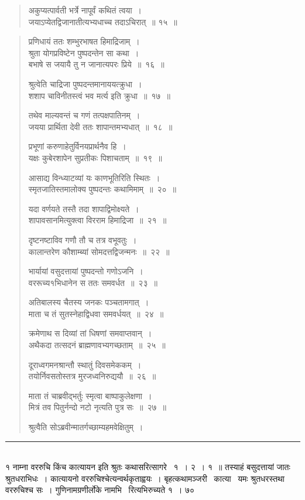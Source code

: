 \documentclass[11pt, openany]{book}
\begin{document}
\begin{multicols}{2}
\begin{quote}
{अकुप्यत्पार्वती भर्त्रे नापूर्वं कथितं त्वया~।\\
जयाऽप्येतद्विजानातीत्यभ्यधाच्च तदाऽचिरात्~॥ १५~॥}
\end{quote}

\columnbreak

\noindent
\begin{quote}
{\mbh प्रणिधायं ततः शम्भुरभाषत हिमाद्रिजाम्~।\\
श्रुता योगप्रविष्टेन पुष्पदन्तेन सा कथा~।\\
बभाषे स जयायै तु न जानात्यपरः प्रिये~॥~१६~॥

श्रुत्वेति चाद्रिजा पुष्पदन्तमानाययत्क्रुधा~।\\
शशाप चाविनीतस्त्वं भव मर्त्य इति क्रुधा~॥~१७~॥

तथेव माल्यवन्तं च गणं तत्पक्षपातिनम्~।\\
जयया प्रार्थिता देवी ततः शापान्तमभ्यधात्~॥~१८~॥

प्रभूणां करुणाहेतुर्विनयप्रार्थनैव हि~।\\ 
यक्षः कुबेरशापेन सुप्रतीकः पिशाचताम्~॥~१९~॥

आसाद्य विन्ध्याटव्यां यः काणभूतिरिति स्थितः~।\\ स्मृतजातिस्तमालोक्य पुष्पदन्तः कथामिमाम्~॥~२०~॥

यदा वर्णयते तस्तै तदा शापाद्विमोक्ष्यते~।\\
शापावसानमित्युक्त्वा विरराम हिमाद्रिजा~॥~२१~॥

दृष्टनष्टाविव गणौ तौ च तत्र वभूवतुः~।\\
कालान्तरेण कौशाम्ब्यां सोमदत्तद्विजन्मनः~॥~२२~॥

भार्यायां वसुदत्तायां पुष्पदन्तो गणोऽजनि~।\\
वररूच्य१भिधानेन स ततः समवर्धत~॥~२३~॥

अतिबालस्य चैतस्य जनकः पञ्चतामगात्~।\\
माता च तं सुतस्नेहाद्विधवा समवर्धयत्~॥~२४~॥

क्रमेणाथ स दिव्यां तां धिषणां समवाप्तवान्~।\\
अथैकदा तत्सदनं ब्राह्मणावभ्यगच्छताम्~॥~२५~॥

दूराध्वगमनश्रान्तौ स्थातुं दिवसमेककम्~।\\
तयोर्निवसतोस्तत्र मुरजध्वनिरुद्ययौ~॥~२६~॥

माता तं चाब्रवीद्भर्तुः स्मृत्वा बाष्पाकुलेक्षणा~।\\
मित्रं तव पितुर्नन्दो नटो नृत्यति पुत्र सः~॥~२७~॥

श्रुत्वैति सोऽब्रवीन्मातर्गच्छाम्यहमवेक्षितुम्~।}
\end{quote}

\noindent
\rule{1\linewidth}{0.5pt}\\

१ {\qt नाम्ना वररुचि किंच कात्यायन इति श्रुतः} कथासरित्सागरे \textendash\ १~। २~। १~॥ तस्याहं बसुदत्तायां जातः श्रुतधराभिधः~। कात्यायनो वररुचिश्चेत्यन्वर्थकृताह्वयः~। {\qt बृहत्कथामञ्जरी \textendash\ कात्या \textendash\ यमः श्रुतधरस्तथा वररुचिश्च सः~। गुणिनामग्रणीर्लोके नामभि \textendash\ रित्यभिरुच्यते} १~। ७०
\end{multicols}
\end{document}
